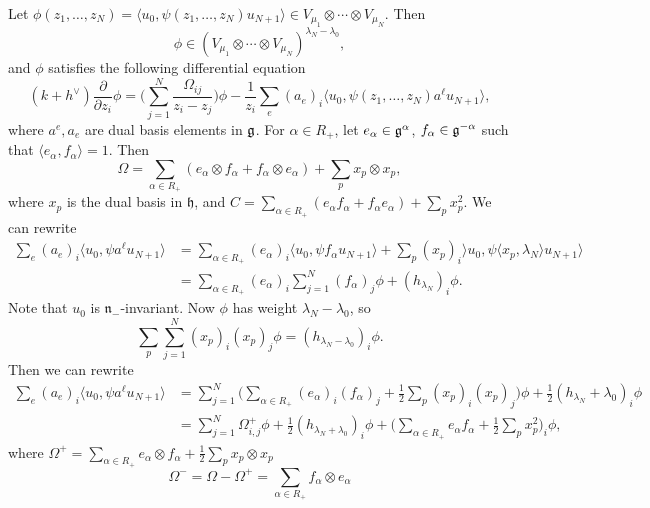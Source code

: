 \begin{remark}
  Let $\phi(z_1, \dots, z_N) = \langle u_0, \psi(z_1, \dots, z_N) u_{N + 1} \rangle \in V_{\mu_1} \otimes \cdots \otimes V_{\mu_N}$.
  Then
  \[\phi \in (V_{\mu_1} \otimes \cdots \otimes V_{\mu_N})^{\lambda_N - \lambda_0},\]
  and $\phi$ satisfies the following
  differential equation
  \[
    (k + h^\vee) \frac{\partial}{\partial z_i} \phi
    = \bigg(
      \sum_{j = 1}^N \frac{\Omega_{ij}}{z_i - z_j}
    \bigg) \phi
    - \frac{1}{z_i} \sum_e (a_e)_i \langle u_0, \psi(z_1, \dots, z_N) a^\ell u_{N + 1} \rangle,
  \]
  where $a^e, a_e$ are dual basis
  elements in $\mathfrak{g}$. For
  $\alpha \in R_+$, let
  $e_\alpha \in \mathfrak{g}^\alpha$,
  $f_\alpha \in \mathfrak{g}^{-\alpha}$ such that
  $\langle e_\alpha, f_\alpha \rangle = 1$. Then
  \[
    \Omega = \sum_{\alpha \in R_+}
    (e_\alpha \otimes f_\alpha + f_\alpha \otimes e_\alpha)
    + \sum_p x_p \otimes x_p,
  \]
  where $x_p$ is the dual
  basis in $\mathfrak{h}$, and
  $C = \sum_{\alpha \in R_+} (e_\alpha f_\alpha + f_\alpha e_\alpha) + \sum_p x_p^2$.
  We can rewrite
  \begin{align*}
    \sum_e (a_e)_i \langle u_0, \psi a^\ell u_{N + 1} \rangle
    &= \sum_{\alpha \in R_+} (e_\alpha)_i
    \langle u_0, \psi f_\alpha u_{N + 1} \rangle
    + \sum_{p} (x_p)_i \rangle u_0, \psi \langle x_p, \lambda_N \rangle u_{N + 1} \rangle \\
    &= \sum_{\alpha \in R_+} (e_\alpha)_i
    \sum_{j = 1}^N (f_\alpha)_j \phi + (h_{\lambda_N})_i \phi.
  \end{align*}
  Note that $u_0$ is $\mathfrak{n}_-$-invariant.
  Now $\phi$ has weight $\lambda_N - \lambda_0$,
  so
  \[
    \sum_p \sum_{j = 1}^N (x_p)_i (x_p)_j \phi
    = (h_{\lambda_N - \lambda_0})_i \phi.
  \]
  Then we can rewrite
  \pagebreak
  \begin{align*}
    \sum_e (a_e)_i \langle u_0, \psi a^\ell u_{N + 1} \rangle
    &= \sum_{j = 1}^N
    \bigg(
      \sum_{\alpha \in R_+} (e_\alpha)_i (f_\alpha)_j
      + \frac{1}{2} \sum_p (x_p)_i (x_p)_j
    \bigg) \phi
    + \frac{1}{2} (h_{\lambda_N} + \lambda_0)_i \phi \\
    &= \sum_{j = 1}^N \Omega_{i, j}^+ \phi
    + \frac{1}{2}(h_{\lambda_N + \lambda_0})_i \phi
    + \bigg(\sum_{\alpha \in R_+} e_\alpha f_\alpha + \frac{1}{2} \sum_p x_p^2\bigg)_i \phi,
  \end{align*}
  where $\Omega^+ = \sum_{\alpha \in R_+} e_\alpha \otimes f_\alpha + \frac{1}{2} \sum_p x_p \otimes x_p$
  \[
    \Omega^- = \Omega - \Omega^+
    = \sum_{\alpha \in R_+} f_\alpha \otimes e_\alpha
\]
\end{remark}

